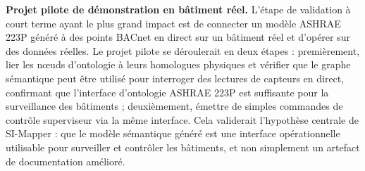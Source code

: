 \textbf{Projet pilote de démonstration en bâtiment réel.}
L'étape de validation à court terme ayant le plus grand impact est de connecter un modèle ASHRAE 223P
généré à des points BACnet en direct sur un bâtiment réel et d'opérer sur des données réelles.
Le projet pilote se déroulerait en deux étapes : premièrement, lier les nœuds d'ontologie à leurs
homologues physiques et vérifier que le graphe sémantique peut être utilisé pour interroger des lectures
de capteurs en direct, confirmant que l'interface d'ontologie ASHRAE 223P est suffisante pour la
surveillance des bâtiments ; deuxièmement, émettre de simples commandes de contrôle superviseur via
la même interface.
Cela validerait l'hypothèse centrale de SI-Mapper : que le modèle sémantique généré est une interface
opérationnelle utilisable pour surveiller et contrôler les bâtiments, et non simplement un artefact de
documentation amélioré.
